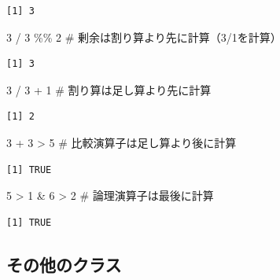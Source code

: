 \documentclass[
  letterpaper,
  DIV=11,
  numbers=noendperiod]{scrreprt}
\newenvironment{Shaded}{\begin{snugshade}}{\end{snugshade}}
\newcommand{\CommentTok}[1]{\textcolor[rgb]{0.37,0.37,0.37}{#1}}
\newcommand{\DecValTok}[1]{\textcolor[rgb]{0.68,0.00,0.00}{#1}}
\newcommand{\SpecialCharTok}[1]{\textcolor[rgb]{0.37,0.37,0.37}{#1}}
\begin{document}
\begin{verbatim}
[1] 3
\end{verbatim}

\begin{Shaded}
\begin{Highlighting}[]
\DecValTok{3} \SpecialCharTok{/} \DecValTok{3} \SpecialCharTok{\%\%} \DecValTok{2} \CommentTok{\# 剰余は割り算より先に計算（3/1を計算）}
\end{Highlighting}
\end{Shaded}

\begin{verbatim}
[1] 3
\end{verbatim}

\begin{Shaded}
\begin{Highlighting}[]
\DecValTok{3} \SpecialCharTok{/} \DecValTok{3} \SpecialCharTok{+} \DecValTok{1} \CommentTok{\# 割り算は足し算より先に計算}
\end{Highlighting}
\end{Shaded}

\begin{verbatim}
[1] 2
\end{verbatim}

\begin{Shaded}
\begin{Highlighting}[]
\DecValTok{3} \SpecialCharTok{+} \DecValTok{3} \SpecialCharTok{\textgreater{}} \DecValTok{5} \CommentTok{\# 比較演算子は足し算より後に計算}
\end{Highlighting}
\end{Shaded}

\begin{verbatim}
[1] TRUE
\end{verbatim}

\begin{Shaded}
\begin{Highlighting}[]
\DecValTok{5} \SpecialCharTok{\textgreater{}} \DecValTok{1} \SpecialCharTok{\&} \DecValTok{6} \SpecialCharTok{\textgreater{}} \DecValTok{2} \CommentTok{\# 論理演算子は最後に計算}
\end{Highlighting}
\end{Shaded}

\begin{verbatim}
[1] TRUE
\end{verbatim}

\hypertarget{ux305dux306eux4ed6ux306eux30afux30e9ux30b9}{%
\subsection{その他のクラス}\label{ux305dux306eux4ed6ux306eux30afux30e9ux30b9}}
\end{document}
